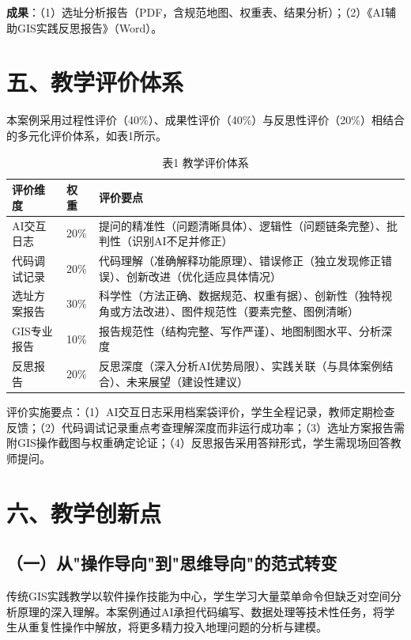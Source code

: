 \documentclass[12pt, a4paper]{article}
\begin{document}
\textbf{成果}：（1）选址分析报告（PDF，含规范地图、权重表、结果分析）；（2）《AI辅助GIS实践反思报告》（Word）。

\newpage

\section{五、教学评价体系}

本案例采用过程性评价（40\%）、成果性评价（40\%）与反思性评价（20\%）相结合的多元化评价体系，如表1所示。

\begin{table}[htbp]
\centering
\caption{表1 教学评价体系}
\begin{tabular}{p{3.5cm}p{2cm}p{8cm}}
\toprule
\textbf{评价维度} & \textbf{权重} & \textbf{评价要点} \\
\midrule
AI交互日志 & 20\% & 提问的精准性（问题清晰具体）、逻辑性（问题链条完整）、批判性（识别AI不足并修正） \\
\midrule
代码调试记录 & 20\% & 代码理解（准确解释功能原理）、错误修正（独立发现修正错误）、创新改进（优化适应具体情况） \\
\midrule
选址方案报告 & 30\% & 科学性（方法正确、数据规范、权重有据）、创新性（独特视角或方法改进）、图件规范性（要素完整、图例清晰） \\
\midrule
GIS专业报告 & 10\% & 报告规范性（结构完整、写作严谨）、地图制图水平、分析深度 \\
\midrule
反思报告 & 20\% & 反思深度（深入分析AI优势局限）、实践关联（与具体案例结合）、未来展望（建设性建议） \\
\bottomrule
\end{tabular}
\end{table}

评价实施要点：（1）AI交互日志采用档案袋评价，学生全程记录，教师定期检查反馈；（2）代码调试记录重点考查理解深度而非运行成功率；（3）选址方案报告需附GIS操作截图与权重确定论证；（4）反思报告采用答辩形式，学生需现场回答教师提问。

\newpage

\section{六、教学创新点}

\subsection{（一）从"操作导向"到"思维导向"的范式转变}

传统GIS实践教学以软件操作技能为中心，学生学习大量菜单命令但缺乏对空间分析原理的深入理解\citep{汤国安2019}。本案例通过AI承担代码编写、数据处理等技术性任务，将学生从重复性操作中解放，将更多精力投入地理问题的分析与建模。
\end{document}
